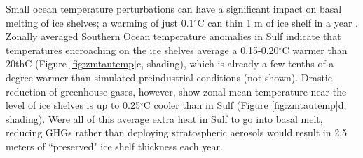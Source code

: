 \documentclass[grl]{AGUTeX}  %
\begin{document}
\begin{article}


Small ocean temperature perturbations can have a significant impact on basal melting of ice shelves; a warming of just 0.1$^\circ$C can thin 1 m of ice shelf in a year \citep{rignot02}. Zonally averaged Southern Ocean temperature anomalies in Sulf indicate that temperatures encroaching on the ice shelves average a 0.15-0.20$^\circ$C warmer than 20thC (Figure \ref{fig:zmtautemp}c, shading), which is already a few tenths of a degree warmer than simulated preindustrial conditions (not shown). Drastic reduction of greenhouse gases, however, show zonal mean temperature near the level of ice shelves is up to 0.25$^\circ$C cooler than in Sulf (Figure \ref{fig:zmtautemp}d, shading). Were all of this average extra heat in Sulf to go into basal melt, reducing GHGs rather than deploying stratospheric aerosols would result in 2.5 meters of ``preserved" ice shelf thickness each year. 


\end{article}
\end{document}
